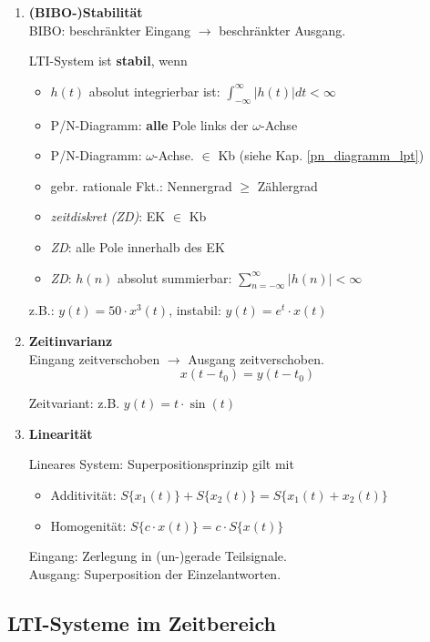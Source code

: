 \begin{enumerate}[leftmargin=*]
  \item {\textbf{(BIBO-)Stabilit\"at}}\\
  \small BIBO: beschr\"ankter Eingang $\rightarrow$ beschr\"ankter Ausgang.\\
\begin{mdframed}[style=exercise]
   LTI-System ist \textbf{stabil}, wenn
   \begin{itemize}
   	   \item $h(t)$ absolut integrierbar ist: $\int_{-\infty}^{\infty} |h(t)| dt <\infty$
   	   \item P/N-Diagramm: \textbf{alle} Pole links der $\omega$-Achse
   	   \item P/N-Diagramm: $\omega$-Achse. $\in$ Kb (siehe Kap. \ref{pn_diagramm_lpt})
   	   \item gebr. rationale Fkt.: Nennergrad $\ge$ Zählergrad
   	   \item \textit{zeitdiskret (ZD)}: EK $\in$ Kb
   	   \item \textit{ZD}: alle Pole innerhalb
   	   des EK
   	    \item \textit{ZD}: $h(n)$ absolut summierbar: $\sum_{n=-\infty}^{\infty} |h(n)|<\infty$
   \end{itemize}
  \end{mdframed}
     z.B.: $y(t) = 50\cdot x^3(t)$, instabil: $y(t) = e^{t}\cdot x(t)$
  \item{\textbf{Zeitinvarianz}}\\
		{\small
		  	Eingang zeitverschoben $\rightarrow$ Ausgang zeitverschoben.
		}
		\[ 
		x(t-t_0) = y(t-t_0)
		 \]
		 
		 {\small Zeitvariant: z.B. $y(t)=t\cdot \sin(t)$}
  \item{\textbf{Linearit\"at}}\\
		  {\small
		      Lineares System: Superpositionsprinzip gilt mit 
		      \begin{itemize}
		      	\item Additivität: $S\{x_1(t)\} + S\{x_2(t)\} = S\{x_1(t)+x_2(t)\}$ 
		      	\item Homogenität: $S\{c\cdot x(t)\}=c \cdot S\{x(t)\}$
		      \end{itemize}
		      Eingang: Zerlegung in (un-)gerade Teilsignale.\\
		      Ausgang: Superposition der Einzelantworten.
		  }
\end{enumerate}
\normalsize
\subsection{LTI-Systeme im Zeitbereich}
